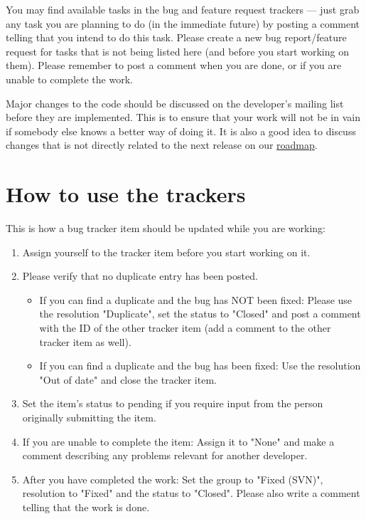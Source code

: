 \documentclass[12pt]{book}
\begin{document}
You may find available tasks in the bug and feature request
trackers --- just grab any task you are planning to do (in the
immediate future) by posting a comment telling that you intend
to do this task. Please create a new bug report/feature request
for tasks that is not being listed here (and before you start
working on them). Please remember to post a comment when
you are done, or if you are unable to complete the work.

Major changes to the code should be discussed on the
developer's mailing list before they are implemented. This is to
ensure that your work will not be in vain if somebody else knows
a better way of doing it. It is also a good idea to discuss changes
that is not directly related to the next release on our
\href{http://www.freecol.org/index.php?section=18}{roadmap}.


\hypertarget{How to use the trackers}{\section{How to use the trackers}}

This is how a bug tracker item should be updated while you are working:

\begin{enumerate}
\item Assign yourself to the tracker item before you start working on it.

\item Please verify that no duplicate entry has been posted.

\begin{itemize}
\item If you can find a duplicate and the bug has NOT been fixed:
  Please use the resolution "Duplicate", set the status to "Closed"
  and post a comment with the ID of the other tracker item (add a
  comment to the other tracker item as well).

\item If you can find a duplicate and the bug has been fixed: Use the
  resolution "Out of date" and close the tracker item.
\end{itemize}

\item Set the item's status to pending if you require input from the person
   originally submitting the item.

\item If you are unable to complete the item: Assign it to "None" and
   make a comment describing any problems relevant for another developer.

\item After you have completed the work: Set the group to "Fixed (SVN)",
   resolution to "Fixed" and the status to "Closed". Please also write
   a comment telling that the work is done.
\end{enumerate}
\end{document}
